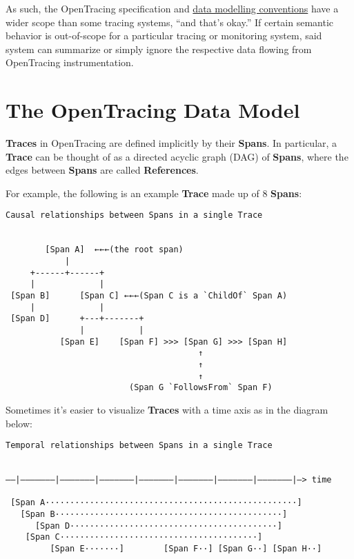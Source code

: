 \documentclass[a4paper,12pt,notitlepage,twoside,openright]{article}
\begin{document}
As such, the OpenTracing specification and
\href{./data_conventions.md}{data modelling conventions} have a wider
scope than some tracing systems, ``and that's okay.'' If certain
semantic behavior is out-of-scope for a particular tracing or monitoring
system, said system can summarize or simply ignore the respective data
flowing from OpenTracing instrumentation.

\hypertarget{the-opentracing-data-model}{%
\section{The OpenTracing Data
Model}\label{the-opentracing-data-model}}

\textbf{Traces} in OpenTracing are defined implicitly by their
\textbf{Spans}. In particular, a \textbf{Trace} can be thought of as a
directed acyclic graph (DAG) of \textbf{Spans}, where the edges between
\textbf{Spans} are called \textbf{References}.

For example, the following is an example \textbf{Trace} made up of 8
\textbf{Spans}:

\begin{verbatim}
Causal relationships between Spans in a single Trace


        [Span A]  ←←←(the root span)
            |
     +------+------+
     |             |
 [Span B]      [Span C] ←←←(Span C is a `ChildOf` Span A)
     |             |
 [Span D]      +---+-------+
               |           |
           [Span E]    [Span F] >>> [Span G] >>> [Span H]
                                       ↑
                                       ↑
                                       ↑
                         (Span G `FollowsFrom` Span F)
\end{verbatim}

Sometimes it's easier to visualize \textbf{Traces} with a time axis as
in the diagram below:

\begin{verbatim}
Temporal relationships between Spans in a single Trace


––|–––––––|–––––––|–––––––|–––––––|–––––––|–––––––|–––––––|–> time

 [Span A···················································]
   [Span B··············································]
      [Span D··········································]
    [Span C········································]
         [Span E·······]        [Span F··] [Span G··] [Span H··]
\end{verbatim}
\end{document}
